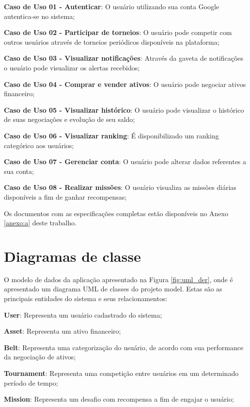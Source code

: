 \begin{lista}
  \item \textbf{Caso de Uso 01 - Autenticar}: O usuário utilizando sua conta Google autentica-se no sistema;
  \item \textbf{Caso de Uso 02 - Participar de torneios}: O usuário pode competir com outros usuários através de torneios periódicos disponíveis na plataforma;
  \item \textbf{Caso de Uso 03 - Visualizar notificações}: Através da gaveta de notificações o usuário pode visualizar os alertas recebidos;
  \item \textbf{Caso de Uso 04 - Comprar e vender ativos}: O usuário pode negociar ativos financeiro;
  \item \textbf{Caso de Uso 05 - Visualizar histórico}: O usuário pode visualizar o histórico de suas negociações e evolução de seu saldo;
  \item \textbf{Caso de Uso 06 - Visualizar ranking}: É disponibilizado um ranking categórico aos usuários;
  \item \textbf{Caso de Uso 07 - Gerenciar conta}: O usuário pode alterar dados referentes a sua conta;
  \item \textbf{Caso de Uso 08 - Realizar missões}: O usuário visualiza as missões diárias disponíveis a fim de ganhar recompensas;
\end{lista}

Os documentos com as especificações completas estão disponíveis no Anexo \ref{anexo:a} deste trabalho.

\section{Diagramas de classe} \label{sec:modelagem:classe}

O modelo de dados da aplicação apresentado na Figura \ref{fig:uml_der}, onde é apresentado um diagrama UML de classes do projeto model. Estas são as principais entidades do sistema e seus relacionamentos:

\begin{lista}
  \item \textbf{User}: Representa um usuário cadastrado do sistema;
  \item \textbf{Asset}: Representa um ativo financeiro;
  \item \textbf{Belt}: Representa uma categorização do usuário, de acordo com sua performance da negociação de ativos;
  \item \textbf{Tournament}: Representa uma competição entre usuários em um determinado período de tempo;
  \item \textbf{Mission}: Representa um desafio com recompensa a fim de engajar o usuário;
\end{lista}


